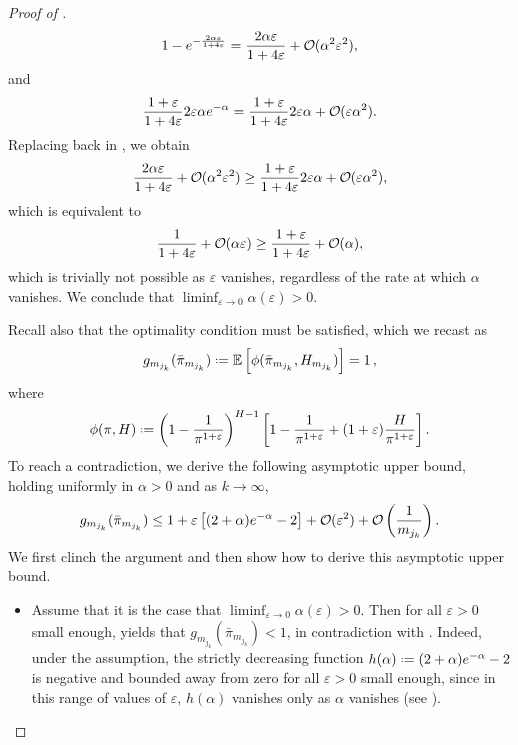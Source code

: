 \documentclass[11pt, a4paper, twoside]{article}
\DeclareRobustCommand{\bigO}{\text{\usefont{OMS}{cmsy}{m}{n}O}}
\newcommand*{\defeq}{\mathrel{\vcenter{\baselineskip0.5ex \lineskiplimit0pt
			\hbox{\scriptsize.}\hbox{\scriptsize.}}}=}
\newcommand{\eps}{\varepsilon}
\newcommand{\EE}{\mathbb{E}}
\numberwithin{equation}{section}
\begin{document}
\begin{proof}[Proof of ]
    		\[
                1-e^{-\frac{2\alpha\eps}{1+4\eps}}
                    =\frac{2\alpha\eps}{1+4\eps}+\bigO(\alpha^2\eps^2),
            \]
    		and
    		\[\frac{1+\eps}{1+4\eps}2\eps\alpha e^{-\alpha}=\frac{1+\eps}{1+4\eps}2\eps\alpha +\bigO(\eps\alpha^2).\]
            Replacing back in , we obtain
    		\[
                \frac{2\alpha\eps}{1+4\eps}+\bigO(\alpha^2\eps^2)\ge\frac{1+\eps}{1+4\eps}2\eps\alpha +\bigO(\eps\alpha^2),
            \]
    		which is equivalent to 
    		\[\frac{1}{1+4\eps}+\bigO(\alpha\eps)\ge\frac{1+\eps}{1+4\eps}+\bigO(\alpha),\]
    		which is trivially not possible as $\eps$ vanishes, regardless of the rate at which $\alpha$ vanishes.
            We conclude that $\liminf_{\eps \to 0} \alpha(\eps) > 0$.
    		
            Recall also that the optimality condition  must be satisfied, which we recast as
    		\begin{equation}\label{maxeq0'}
    			g_{m_{j_k}}(\bar{\pi}_{m_{j_k}})
                    \defeq \EE \left[ \phi(\bar{\pi}_{m_{j_k}},H_{m_{j_k}})\right]
                    = 1 \,,
    		\end{equation}
    		where \[\phi(\pi,H)\defeq \left(1-\frac{1}{\pi^{1+\eps}}\right)^{H-1}\left[1-\frac{1}{\pi^{1+\eps}}+(1+\eps)\frac{H}{\pi^{1+\eps}}\right].\]
    		To reach a contradiction, we derive the following asymptotic upper bound, holding uniformly in $\alpha>0$ and as $k\longrightarrow\infty$,
    		\begin{equation}\label{ebound}
    			g_{m_{j_k}}(\bar{\pi}_{m_{j_k}})
                    \le 1 + \eps \left[(2+\alpha) e^{-\alpha}-2\right] + \bigO(\eps^2)+ \bigO \left(\frac{1}{m_{j_k}}\right).
    		\end{equation}
    		We first clinch the argument and then show how to derive this asymptotic upper bound. 
    		\begin{itemize}[noitemsep]
    		\item Assume that it is the case that $\liminf_{\eps \to 0} \alpha(\eps) > 0$. Then for all $\eps>0$ small enough,  yields that $g_{m_{j_k}}(\bar{\pi}_{m_{j_k}})<1$, in contradiction with . Indeed, under the assumption, the strictly decreasing function $h(\alpha)\defeq (2+\alpha)e^{-\alpha}-2$ is negative and bounded away from zero for all $\eps>0$ small enough, since in this range of values of $\eps$, $h(\alpha)$ vanishes only as $\alpha$ vanishes (see ). 
    		\begin{figure}\centering
    			\begin{tikzpicture}[scale = .7]

\end{tikzpicture}
\end{figure}
\end{itemize}
\end{proof}
\end{document}
